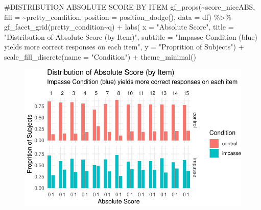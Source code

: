 \documentclass[
  letterpaper,
  DIV=11,
  numbers=noendperiod]{scrreprt}
\newenvironment{Shaded}{\begin{snugshade}}{\end{snugshade}}
\newcommand{\AttributeTok}[1]{\textcolor[rgb]{0.40,0.45,0.13}{#1}}
\newcommand{\CommentTok}[1]{\textcolor[rgb]{0.37,0.37,0.37}{#1}}
\newcommand{\FunctionTok}[1]{\textcolor[rgb]{0.28,0.35,0.67}{#1}}
\newcommand{\NormalTok}[1]{\textcolor[rgb]{0.00,0.23,0.31}{#1}}
\newcommand{\SpecialCharTok}[1]{\textcolor[rgb]{0.37,0.37,0.37}{#1}}
\newcommand{\StringTok}[1]{\textcolor[rgb]{0.13,0.47,0.30}{#1}}
\begin{document}
\begin{Shaded}
\begin{Highlighting}[]
\CommentTok{\#DISTRIBUTION ABSOLUTE SCORE BY ITEM}
\FunctionTok{gf\_props}\NormalTok{(}\SpecialCharTok{\textasciitilde{}}\NormalTok{score\_niceABS, }\AttributeTok{fill =} \SpecialCharTok{\textasciitilde{}}\NormalTok{pretty\_condition, }\AttributeTok{position =} \FunctionTok{position\_dodge}\NormalTok{(), }\AttributeTok{data =}\NormalTok{ df)  }\SpecialCharTok{\%\textgreater{}\%} 
  \FunctionTok{gf\_facet\_grid}\NormalTok{(pretty\_condition}\SpecialCharTok{\textasciitilde{}}\NormalTok{q) }\SpecialCharTok{+} 
  \FunctionTok{labs}\NormalTok{( }\AttributeTok{x =} \StringTok{"Absolute Score"}\NormalTok{, }
        \AttributeTok{title =} \StringTok{"Distribution of Absolute Score (by Item)"}\NormalTok{,}
        \AttributeTok{subtitle =} \StringTok{"Impasse Condition (blue) yields more correct responses on each item"}\NormalTok{,}
        \AttributeTok{y =} \StringTok{"Proprition of Subjects"}\NormalTok{) }\SpecialCharTok{+}
  \FunctionTok{scale\_fill\_discrete}\NormalTok{(}\AttributeTok{name =} \StringTok{"Condition"}\NormalTok{) }\SpecialCharTok{+}  
  \FunctionTok{theme\_minimal}\NormalTok{()}
\end{Highlighting}
\end{Shaded}

\begin{figure}[H]

{\centering \includegraphics{analysis/SGC3A/2_sgc3A_scoring_files/figure-pdf/DISTR-ABSCORE-2.pdf}

}

\end{figure}
\end{document}
